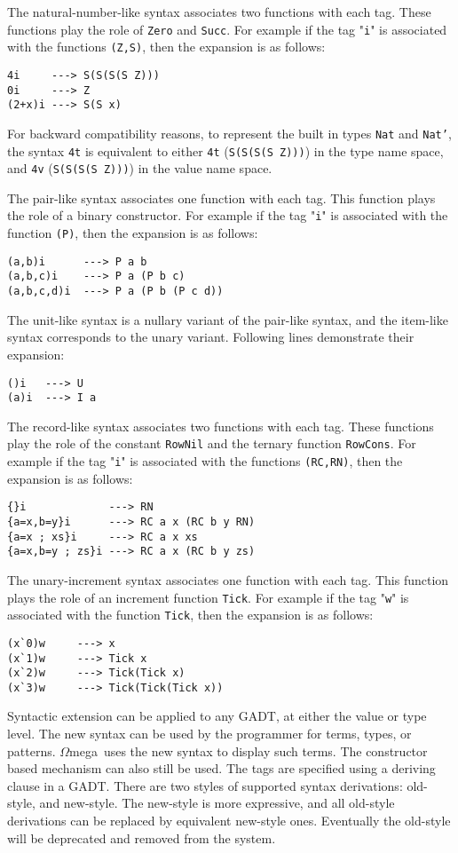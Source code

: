 \documentclass[11pt,twoside]{article}
\newcommand{\om}{$\Omega$mega}
\begin{document}
The natural-number-like syntax associates two functions with each
tag. These functions play the role of {\tt Zero} and {\tt Succ}.
For example if the tag "{\tt i}" is associated with
the functions {\tt (Z,S)}, then the expansion is as follows:
\begin{verbatim}
4i     ---> S(S(S(S Z)))
0i     ---> Z
(2+x)i ---> S(S x)
\end{verbatim}
For backward compatibility reasons, to represent the
built in types {\tt Nat} and {\tt Nat'}, the syntax \verb+4t+ is equivalent
to either \verb+4t+ ({\tt  S(S(S(S Z)))}) in the type name space, and \verb+4v+
({\tt  S(S(S(S Z)))}) in the value name space.


The pair-like syntax associates one function with each
tag. This function plays the role of a binary constructor.
For example if the tag "{\tt i}" is associated with
the function {\tt (P)}, then the expansion is as follows:
\begin{verbatim}
(a,b)i      ---> P a b
(a,b,c)i    ---> P a (P b c)
(a,b,c,d)i  ---> P a (P b (P c d))
\end{verbatim}
The unit-like syntax is a nullary variant of the pair-like syntax,
and the item-like syntax corresponds to the unary variant. Following
lines demonstrate their expansion:
\begin{verbatim}
()i   ---> U
(a)i  ---> I a
\end{verbatim}

The record-like syntax associates two functions with each
tag. These functions play the role of the constant {\tt RowNil} and
the ternary function {\tt RowCons}.
For example if the tag "{\tt i}" is associated with
the functions {\tt (RC,RN)}, then the expansion is as follows:
\begin{verbatim}
{}i             ---> RN
{a=x,b=y}i      ---> RC a x (RC b y RN)
{a=x ; xs}i     ---> RC a x xs
{a=x,b=y ; zs}i ---> RC a x (RC b y zs)
\end{verbatim}

The unary-increment syntax associates one function with each tag. This function
plays the role of an increment function {\tt Tick}.
For example if the tag "{\tt w}" is associated with
the function {\tt Tick}, then the expansion is as follows:
\begin{verbatim}
(x`0)w     ---> x
(x`1)w     ---> Tick x
(x`2)w     ---> Tick(Tick x)
(x`3)w     ---> Tick(Tick(Tick x))
\end{verbatim}



Syntactic extension can be applied to any GADT, at either the value or type level. The
new syntax can be used by the programmer for terms, types, or patterns. \om\ uses the
new syntax to display such terms. The constructor based mechanism can also still
be used. The tags are specified using a deriving clause in a GADT.
There are two styles of supported syntax derivations: old-style, and new-style.
The new-style is more expressive, and all old-style derivations
can be replaced by equivalent new-style ones. Eventually the old-style will
be deprecated and removed from the system.
\end{document}
